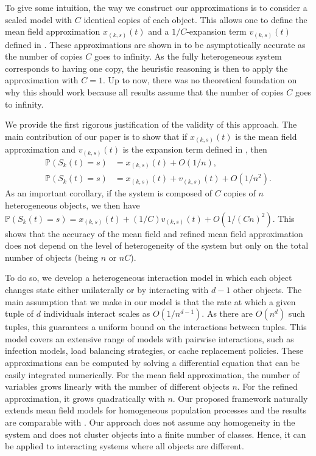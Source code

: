 \documentclass[acmsmall]{acmart}
\newcommand\Proba[1]{\mathbb{P}\left(#1\right)} %
\begin{document}
To give some intuition, the way we construct our approximations is to consider a scaled model with $C$ identical copies of each object. This allows one to define the mean field approximation $x_{(k,s)}(t)$ and a $1/C$-expansion term $v_{(k,s)}(t)$ defined in \cite{gastSizeExpansionsMean2019}. These approximations are shown in \cite{gastSizeExpansionsMean2019} to be asymptotically accurate as the number of copies $C$ goes to infinity. As the fully heterogeneous system corresponds to having one copy, the heuristic reasoning is then to apply the approximation with $C=1$. Up to now, there was no theoretical foundation on why this should work because all results assume that the number of copies $C$ goes to infinity.

We provide the first rigorous justification of the validity of this approach. The main contribution of our paper is to show that if $x_{(k,s)}(t)$ is the mean field approximation and $v_{(k,s)}(t)$ is the expansion term defined in \cite{gastSizeExpansionsMean2019}, then
\begin{align*}
  \Proba{S_k(t)=s} &= x_{(k,s)}(t) + O(1/n),\\
  \Proba{S_k(t)=s} &= x_{(k,s)}(t) + v_{(k,s)}(t) + O(1/n^2).
\end{align*}
{\color{myorange}As an important corollary, if the system is composed of $C$ copies of $n$ heterogeneous objects, we then have $\Proba{S_k(t)=s} = x_{(k,s)}(t) + (1/C) v_{(k,s)}(t) + O(1/(Cn)^2)$. This shows that the accuracy of the mean field and refined mean field approximation does not depend on the level of heterogeneity of the system but only on the total number of objects (being $n$ or $nC$).}

To do so, we develop a {\color{myorange} heterogeneous interaction model in which each object changes state either unilaterally or by interacting with $d-1$ other objects. The main assumption that we make in our model is that the rate at which a given tuple of $d$ individuals interact scales as $O(1/n^{d-1})$. As there are $O(n^d)$ such tuples, this guarantees a uniform bound on the interactions between tuples.} This model covers an extensive range of models with pairwise interactions, such as infection models, load balancing strategies, or cache replacement policies. These approximations can be computed by solving a differential equation that can be easily integrated numerically. For the mean field approximation, the number of variables grows linearly with the number of different objects $n$. For the refined approximation, it grows quadratically with $n$. Our proposed framework naturally extends mean field models for homogeneous population processes and the results are comparable with \cite{gast2017expected,kurtzStrongApproximationTheorems1978,ying2016rate}. Our approach does not assume any homogeneity in the system and does not cluster objects into a finite number of classes. Hence, it can be applied to interacting systems where all objects are different.
\end{document}
